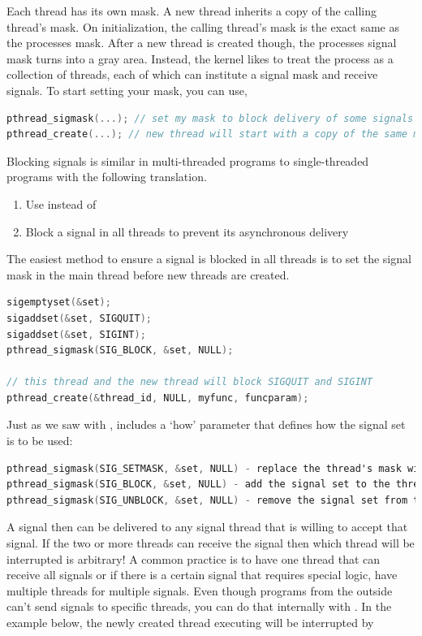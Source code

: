 Each thread has its own mask.
A new thread inherits a copy of the calling thread's mask.
On initialization, the calling thread's mask is the exact same as the processes mask.
After a new thread is created though, the processes signal mask turns into a gray area.
Instead, the kernel likes to treat the process as a collection of threads, each of which can institute a signal mask and receive signals.
To start setting your mask, you can use,

\begin{lstlisting}[language=C]
pthread_sigmask(...); // set my mask to block delivery of some signals
pthread_create(...); // new thread will start with a copy of the same mask
\end{lstlisting}

Blocking signals is similar in multi-threaded programs to single-threaded programs with the following translation.

\begin{enumerate}
\item Use  instead of 
\item Block a signal in all threads to prevent its asynchronous delivery
\end{enumerate}

The easiest method to ensure a signal is blocked in all threads is to set the signal mask in the main thread before new threads are created.

\begin{lstlisting}[language=C]
sigemptyset(&set);
sigaddset(&set, SIGQUIT);
sigaddset(&set, SIGINT);
pthread_sigmask(SIG_BLOCK, &set, NULL);

// this thread and the new thread will block SIGQUIT and SIGINT
pthread_create(&thread_id, NULL, myfunc, funcparam);
\end{lstlisting}

Just as we saw with ,  includes a `how' parameter that defines how the signal set is to be used:

\begin{lstlisting}[language=C]
pthread_sigmask(SIG_SETMASK, &set, NULL) - replace the thread's mask with given signal set
pthread_sigmask(SIG_BLOCK, &set, NULL) - add the signal set to the thread's mask
pthread_sigmask(SIG_UNBLOCK, &set, NULL) - remove the signal set from the thread's mask
\end{lstlisting}

A signal then can be delivered to any signal thread that is willing to accept that signal.
If the two or more threads can receive the signal then which thread will be interrupted is arbitrary!
A common practice is to have one thread that can receive all signals or if there is a certain signal that requires special logic, have multiple threads for multiple signals.
Even though programs from the outside can't send signals to specific threads, you can do that internally with .
In the example below, the newly created thread executing  will be interrupted by 

